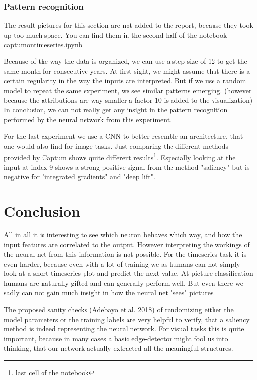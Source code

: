 \documentclass{article}
\begin{document}
\subsubsection{Pattern recognition}
The result-pictures for this section are not added to the report, because they took up too much space. You can find them in the second half of the notebook captum\textunderscore on\textunderscore timeseries.ipynb

Because of the way the data is organized, we can use a step size of 12 to get the same month for consecutive years. At first sight, we might assume that there is a certain regularity in the way the inputs are interpreted. But if we use a random model to repeat the same experiment, we see similar patterns emerging. (however because the attributions are way smaller a factor 10 is added to the visualization) In conclusion, we can not really get any insight in the pattern recognition performed by the neural network from this experiment.

For the last experiment we use a CNN to better resemble an architecture, that one would also find for image tasks. Just comparing the different methods provided by Captum shows quite different results\footnote{last cell of the notebook}. Especially looking at the input at index 9 shows a strong positive signal from the method "saliency" but is negative for "integrated gradients" and "deep lift".

\section{Conclusion}
All in all it is interesting to see which neuron behaves which way, and how the input features are correlated to the output. However interpreting the workings of the neural net from this information is not possible. For the timeseries-task it is even harder, because even with a lot of training we as humans can not simply look at a short timeseries plot and predict the next value. At picture classification humans are naturally gifted and can generally perform well. But even there we sadly can not gain much insight in how the neural net "sees" pictures. 

The proposed sanity checks (Adebayo et al. 2018) of randomizing either the model parameters or the training labels are very helpful to verify, that a saliency method is indeed representing the neural network. For visual tasks this is quite important, because in many cases a basic edge-detector might fool us into thinking, that our network actually extracted all the meaningful structures.
\end{document}
